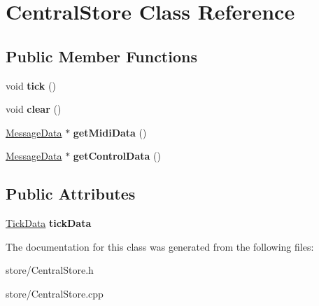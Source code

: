 \hypertarget{classCentralStore}{}\section{Central\+Store Class Reference}
\label{classCentralStore}
\subsection*{Public Member Functions}
\begin{DoxyCompactItemize}
\item 
void {\bfseries tick} ()\hypertarget{classCentralStore_ab809e0f4e90d4d8d1873a89f3da889b3}{}\label{classCentralStore_ab809e0f4e90d4d8d1873a89f3da889b3}

\item 
void {\bfseries clear} ()\hypertarget{classCentralStore_a100ae6ad2506d4962d23966e23a1c78e}{}\label{classCentralStore_a100ae6ad2506d4962d23966e23a1c78e}

\item 
\hyperlink{classMessageData}{Message\+Data} $\ast$ {\bfseries get\+Midi\+Data} ()\hypertarget{classCentralStore_a3511c2c674102f4d469bd32d5e6d141f}{}\label{classCentralStore_a3511c2c674102f4d469bd32d5e6d141f}

\item 
\hyperlink{classMessageData}{Message\+Data} $\ast$ {\bfseries get\+Control\+Data} ()\hypertarget{classCentralStore_ad65ed253412985751bf604085c1f5733}{}\label{classCentralStore_ad65ed253412985751bf604085c1f5733}

\end{DoxyCompactItemize}
\subsection*{Public Attributes}
\begin{DoxyCompactItemize}
\item 
\hyperlink{structTickData}{Tick\+Data} {\bfseries tick\+Data}\hypertarget{classCentralStore_a6f0c4050f0983924bbad8c631746f8b7}{}\label{classCentralStore_a6f0c4050f0983924bbad8c631746f8b7}

\end{DoxyCompactItemize}


The documentation for this class was generated from the following files\+:\begin{DoxyCompactItemize}
\item 
store/Central\+Store.\+h\item 
store/Central\+Store.\+cpp\end{DoxyCompactItemize}
